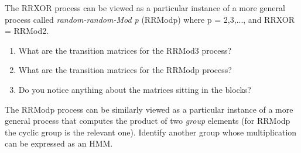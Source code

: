 \begin{exercise}
\label{ex:hmm-ext-1}
The RRXOR process can be viewed as a particular instance of a more general process called \emph{random-random-Mod p} (RRModp) where p = 2,3,..., and RRXOR = RRMod2.

\begin{enumerate}
\item
  What are the transition matrices for the RRMod3 process?
\item
  What are the transition matrices for the RRModp process?
\item
  Do you notice anything about the matrices sitting in the blocks?
\end{enumerate}
\end{exercise}

\begin{exercise}
\label{ex:hmm-ext-2}
The RRModp process can be similarly viewed as a particular instance of a more general process that computes the product of two \emph{group} elements (for RRModp the cyclic group is the relevant one). Identify another group whose multiplication can be expressed as an HMM.
\end{exercise}
